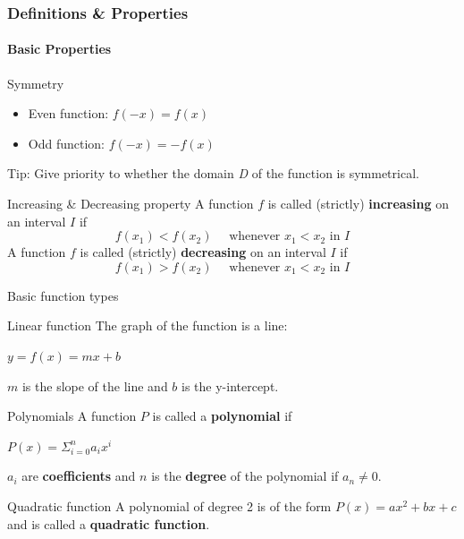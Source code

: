 \begin{frame}
    \frametitle{Definitions \& Properties}
    \framesubtitle{Basic Properties}
    \begin{block}{Symmetry}
        \begin{itemize}
            \item Even function: $f(-x)=f(x)$
            \item Odd function: $f(-x)=-f(x)$
        \end{itemize}
        Tip: Give priority to whether the domain \textit{D} of the function is symmetrical.
    \end{block}
    \begin{block}{Increasing \& Decreasing property}
        A function $f$ is called (strictly) \textbf{increasing} on an interval $I$ if
        $$
            f\left(x_{1}\right)<f\left(x_{2}\right) \quad \text { whenever } x_{1}<x_{2} \text { in } I
        $$
        A function $f$ is called (strictly) \textbf{decreasing} on an interval $I$ if
        $$
            f\left(x_{1}\right)>f\left(x_{2}\right) \quad \text { whenever } x_{1}<x_{2} \text { in } I
        $$
    \end{block}
\end{frame}
\begin{frame}{Basic function types}
    \begin{block}{Linear function}
        The graph of the function is a line:
        \begin{center}
            $y=f(x)=mx+b$
        \end{center}
        $m$ is the slope of the line and $b$ is the y-intercept.
    \end{block}

    \begin{block}{Polynomials}
        A function $P$ is called a \textbf{polynomial} if
        \begin{center}
            $P(x)=\Sigma_{i=0}^n a_ix^i$
        \end{center}
        $a_i$ are \textbf{coefficients} and $n$ is the \textbf{degree} of the polynomial if $a_n\neq0$.
    \end{block}
    \begin{block}{Quadratic function}
        A polynomial of degree 2 is of the form $P(x)=ax^2+bx+c$ and is called a \textbf{quadratic function}.
    \end{block}

\end{frame}

